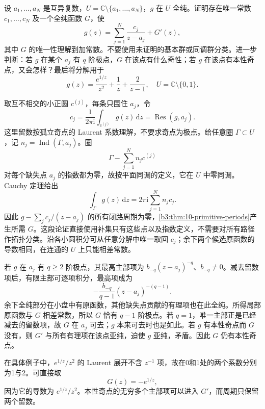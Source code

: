 \begin{exercise}\label{b3:ex:10-4}
设 \(a_1,\ldots,a_N\) 是互异复数，\(U=\mathbb C\setminus\{a_1,\ldots,a_N\}\)，\(g\) 在 \(U\) 全纯。证明存在唯一常数 \(c_1,\ldots,c_N\) 及一个全纯函数 \(G\)，使
\[
 g(z)=\sum_{j=1}^N\frac{c_j}{z-a_j}+G'(z),
\]
其中 \(G\) 的唯一性理解到加常数。不要使用未证明的基本群或同调群分类。进一步判断：若 \(g\) 在某个 \(a_j\) 有 \(q\) 阶极点，\(G\) 在该点有什么奇性；若 \(g\) 在该点有本性奇点，又会怎样？最后将分解用于
\[
 g(z)=\frac{e^{1/z}}{z^2}+\frac1z+\frac2{z-1},
 \quad U=\mathbb C\setminus\{0,1\}.
\]
\end{exercise}
\begin{solution}
取互不相交的小正圆 \(c^{(j)}\)，每条只围住 \(a_j\)，令
\[
 c_j=\frac1{2\pi\mathrm i}\int_{c^{(j)}}g(z)\,\mathrm dz
     =\operatorname{Res}(g,a_j).
\]
这里留数按孤立奇点的 Laurent 系数理解，不要求奇点为极点。给任意圈 \(\Gamma\subset U\)，记 \(n_j=\operatorname{Ind}(\Gamma,a_j)\)。圈
\[
 \Gamma-\sum_{j=1}^N n_jc^{(j)}
\]
对每个缺失点 \(a_j\) 的指数都为零，故按平面同调的定义，它在 \(U\) 中零同调。Cauchy 定理给出
\[
 \int_\Gamma g(z)\,\mathrm dz
 =2\pi\mathrm i\sum_{j=1}^N n_jc_j.
\]
因此 \(g-\sum_j c_j/(z-a_j)\) 的所有闭路周期为零，\cref{b3:thm:10-primitive-periods}产生所需 \(G\)。这段论证直接使用补集只有这些点以及指数定义，不需要对所有路径作拓扑分类。沿各小圆积分可从任意分解中唯一取回 \(c_j\)；余下两个候选原函数的导数相同，在连通的 \(U\) 上只能相差常数。

若 \(g\) 在 \(a_j\) 有 \(q\ge2\) 阶极点，其最高主部项为 \(b_{-q}(z-a_j)^{-q}\)、\(b_{-q}\ne0\)。减去留数项后，有限主部可逐项积分，最高项成为
\[
 -\frac{b_{-q}}{q-1}(z-a_j)^{-(q-1)}.
\]
余下全纯部分在小盘中有原函数，其他缺失点贡献的有理项也在此全纯。所得局部原函数与 \(G\) 相差常数，所以 \(G\) 恰有 \(q-1\) 阶极点。若 \(q=1\)，唯一主部正是已经减去的留数项，故 \(G\) 在 \(a_j\) 可去；\(g\) 本来可去时也是如此。若 \(g\) 有本性奇点而 \(G\) 没有，则 \(G'\) 与所有有理项在该点亚纯，迫使 \(g\) 亚纯，矛盾。因此 \(G\) 仍有本性奇点。

在具体例子中，\(e^{1/z}/z^2\) 的 Laurent 展开不含 \(z^{-1}\) 项，故在0和1处的两个系数分别为1与2。可直接取
\[
 G(z)=-e^{1/z},
\]
因为它的导数为 \(e^{1/z}/z^2\)。本性奇点的无穷多个主部项可以进入 \(G'\)，而周期只保留两个留数。
\end{solution}

